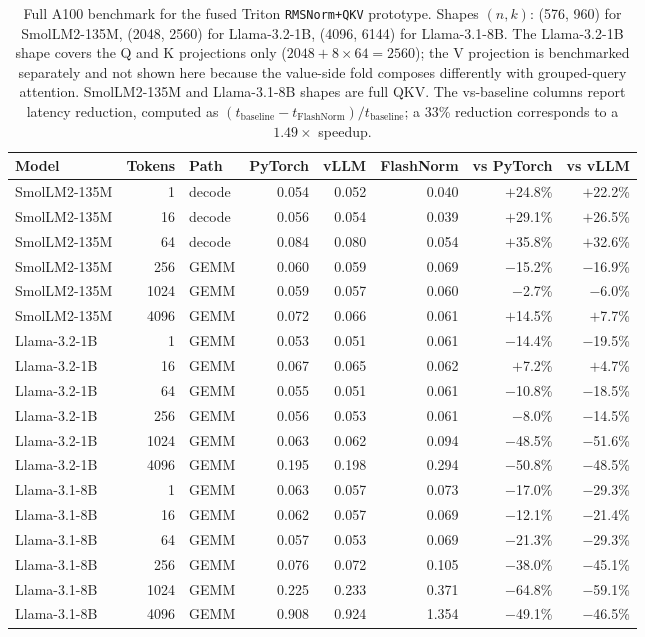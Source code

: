 \documentclass{article}
\begin{document}
\begin{table}[h!] \centering
\caption{Full A100 benchmark for the fused Triton \texttt{RMSNorm+QKV} prototype. Shapes $(n, k)$: (576, 960) for SmolLM2-135M, (2048, 2560) for Llama-3.2-1B, (4096, 6144) for Llama-3.1-8B. The Llama-3.2-1B shape covers the Q and K projections only ($2048 + 8{\times}64 = 2560$); the V projection is benchmarked separately and not shown here because the value-side fold composes differently with grouped-query attention. SmolLM2-135M and Llama-3.1-8B shapes are full QKV. The vs-baseline columns report latency reduction, computed as $(t_{\text{baseline}} - t_{\text{FlashNorm}})/t_{\text{baseline}}$; a 33\% reduction corresponds to a $1.49\times$ speedup.}
\label{tab:a100-full}
\small
\begin{tabular}{l r l r r r r r}
\hline
Model & Tokens & Path & PyTorch & vLLM & FlashNorm & vs PyTorch & vs vLLM \\
\hline
SmolLM2-135M & 1    & decode & 0.054 & 0.052 & 0.040 & $+$24.8\% & $+$22.2\% \\
SmolLM2-135M & 16   & decode & 0.056 & 0.054 & 0.039 & $+$29.1\% & $+$26.5\% \\
SmolLM2-135M & 64   & decode & 0.084 & 0.080 & 0.054 & $+$35.8\% & $+$32.6\% \\
SmolLM2-135M & 256  & GEMM   & 0.060 & 0.059 & 0.069 & $-$15.2\% & $-$16.9\% \\
SmolLM2-135M & 1024 & GEMM   & 0.059 & 0.057 & 0.060 & $-$2.7\%  & $-$6.0\%  \\
SmolLM2-135M & 4096 & GEMM   & 0.072 & 0.066 & 0.061 & $+$14.5\% & $+$7.7\%  \\
\hline
Llama-3.2-1B & 1    & GEMM   & 0.053 & 0.051 & 0.061 & $-$14.4\% & $-$19.5\% \\
Llama-3.2-1B & 16   & GEMM   & 0.067 & 0.065 & 0.062 & $+$7.2\%  & $+$4.7\%  \\
Llama-3.2-1B & 64   & GEMM   & 0.055 & 0.051 & 0.061 & $-$10.8\% & $-$18.5\% \\
Llama-3.2-1B & 256  & GEMM   & 0.056 & 0.053 & 0.061 & $-$8.0\%  & $-$14.5\% \\
Llama-3.2-1B & 1024 & GEMM   & 0.063 & 0.062 & 0.094 & $-$48.5\% & $-$51.6\% \\
Llama-3.2-1B & 4096 & GEMM   & 0.195 & 0.198 & 0.294 & $-$50.8\% & $-$48.5\% \\
\hline
Llama-3.1-8B & 1    & GEMM   & 0.063 & 0.057 & 0.073 & $-$17.0\% & $-$29.3\% \\
Llama-3.1-8B & 16   & GEMM   & 0.062 & 0.057 & 0.069 & $-$12.1\% & $-$21.4\% \\
Llama-3.1-8B & 64   & GEMM   & 0.057 & 0.053 & 0.069 & $-$21.3\% & $-$29.3\% \\
Llama-3.1-8B & 256  & GEMM   & 0.076 & 0.072 & 0.105 & $-$38.0\% & $-$45.1\% \\
Llama-3.1-8B & 1024 & GEMM   & 0.225 & 0.233 & 0.371 & $-$64.8\% & $-$59.1\% \\
Llama-3.1-8B & 4096 & GEMM   & 0.908 & 0.924 & 1.354 & $-$49.1\% & $-$46.5\% \\
\hline
\end{tabular}
\end{table}
\end{document}
